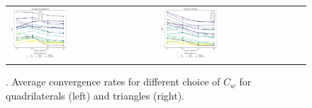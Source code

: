 \begin{example}
\begin{figure}[h!]
	\centering
	\begin{tabular}{p{} p{}}
		\vspace{0pt} 
		\includegraphics[width=0.4\textwidth]{../figs/parametric/advdiff_2D/ord_quarteroni1_2_4}
		&
		\vspace{0pt} 
		\includegraphics[width=0.4\textwidth]{../figs/parametric/advdiff_2D/ord_quarteroni1_2_3}
	\end{tabular}
	\caption{. Average convergence rates for different choice of $C_w$ 
	for quadrilaterals (left) and triangles (right).}
	\label{fig:orders_quarteroni1}
\end{figure}



\end{example}
